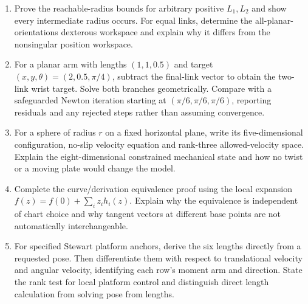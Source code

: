 \begin{enumerate}
\item\label{ex:ch3_11} Prove the reachable-radius bounds for arbitrary positive $L_1,L_2$ and show every intermediate radius occurs. For equal links, determine the all-planar-orientations dexterous workspace and explain why it differs from the nonsingular position workspace.
\item\label{ex:ch3_12} For a planar arm with lengths $(1,1,0.5)$ and target $(x,y,\theta)=(2,0.5,\pi/4)$, subtract the final-link vector to obtain the two-link wrist target. Solve both branches geometrically. Compare with a safeguarded Newton iteration starting at $(\pi/6,\pi/6,\pi/6)$, reporting residuals and any rejected steps rather than assuming convergence.
\item\label{ex:ch3_13} For a sphere of radius $r$ on a fixed horizontal plane, write its five-dimensional configuration, no-slip velocity equation and rank-three allowed-velocity space. Explain the eight-dimensional constrained mechanical state and how no twist or a moving plate would change the model.
\item\label{ex:ch3_14} Complete the curve/derivation equivalence proof using the local expansion $f(z)=f(0)+\sum_i z_i h_i(z)$. Explain why the equivalence is independent of chart choice and why tangent vectors at different base points are not automatically interchangeable.
\item\label{ex:ch3_15} For specified Stewart platform anchors, derive the six lengths directly from a requested pose. Then differentiate them with respect to translational velocity and angular velocity, identifying each row's moment arm and direction. State the rank test for local platform control and distinguish direct length calculation from solving pose from lengths.
\end{enumerate}
